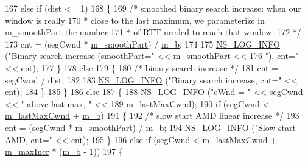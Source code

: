 \begin{DoxyCode}
167       \textcolor{keywordflow}{else} \textcolor{keywordflow}{if} (dist <= 1)
168         \{
169           \textcolor{comment}{/* smoothed binary search increase: when our window is really}
170 \textcolor{comment}{           * close to the last maximum, we parameterize in m\_smoothPart the number}
171 \textcolor{comment}{           * of RTT needed to reach that window.}
172 \textcolor{comment}{           */}
173           cnt = (segCwnd * \hyperlink{classns3_1_1TcpBic_a69437c77ce1d0e51238f51c262d58bf1}{m\_smoothPart}) / \hyperlink{classns3_1_1TcpBic_a3f94d435d1b4821077da9acb72fd8d5f}{m\_b};
174 
175           \hyperlink{group__logging_gafbd73ee2cf9f26b319f49086d8e860fb}{NS\_LOG\_INFO} (\textcolor{stringliteral}{"Binary search increase (smoothPart="} << 
      \hyperlink{classns3_1_1TcpBic_a69437c77ce1d0e51238f51c262d58bf1}{m\_smoothPart} <<
176                        \textcolor{stringliteral}{"), cnt="} << cnt);
177         \}
178       \textcolor{keywordflow}{else}
179         \{
180           \textcolor{comment}{/* binary search increase */}
181           cnt = segCwnd / dist;
182 
183           \hyperlink{group__logging_gafbd73ee2cf9f26b319f49086d8e860fb}{NS\_LOG\_INFO} (\textcolor{stringliteral}{"Binary search increase, cnt="} << cnt);
184         \}
185     \}
186   \textcolor{keywordflow}{else}
187     \{
188       \hyperlink{group__logging_gafbd73ee2cf9f26b319f49086d8e860fb}{NS\_LOG\_INFO} (\textcolor{stringliteral}{"cWnd = "} << segCwnd << \textcolor{stringliteral}{" above last max, "} <<
189                    \hyperlink{classns3_1_1TcpBic_a082025c05e83dcddab77a6e3209cd4eb}{m\_lastMaxCwnd});
190       \textcolor{keywordflow}{if} (segCwnd < \hyperlink{classns3_1_1TcpBic_a082025c05e83dcddab77a6e3209cd4eb}{m\_lastMaxCwnd} + \hyperlink{classns3_1_1TcpBic_a3f94d435d1b4821077da9acb72fd8d5f}{m\_b})
191         \{
192           \textcolor{comment}{/* slow start AMD linear increase */}
193           cnt = (segCwnd * \hyperlink{classns3_1_1TcpBic_a69437c77ce1d0e51238f51c262d58bf1}{m\_smoothPart}) / \hyperlink{classns3_1_1TcpBic_a3f94d435d1b4821077da9acb72fd8d5f}{m\_b};
194           \hyperlink{group__logging_gafbd73ee2cf9f26b319f49086d8e860fb}{NS\_LOG\_INFO} (\textcolor{stringliteral}{"Slow start AMD, cnt="} << cnt);
195         \}
196       \textcolor{keywordflow}{else} \textcolor{keywordflow}{if} (segCwnd < \hyperlink{classns3_1_1TcpBic_a082025c05e83dcddab77a6e3209cd4eb}{m\_lastMaxCwnd} + \hyperlink{classns3_1_1TcpBic_a79db4e8443cc0a27388a80566327a5a0}{m\_maxIncr} * (\hyperlink{classns3_1_1TcpBic_a3f94d435d1b4821077da9acb72fd8d5f}{m\_b} - 1))
197         \{

\end{DoxyCode}
